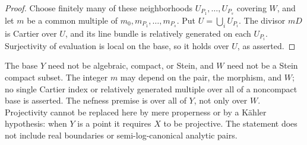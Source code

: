 \begin{proof}
Choose finitely many of these neighborhoods \(U_{P_1},\ldots,U_{P_s}\)
covering \(W\), and let \(m\) be a common multiple of
\(m_0,m_{P_1},\ldots,m_{P_s}\). Put \(U=\bigcup_i U_{P_i}\).
The divisor \(mD\) is Cartier over \(U\), and its line bundle is
relatively generated on each \(U_{P_i}\). Surjectivity of evaluation
is local on the base, so it holds over \(U\), as asserted.
\end{proof}

The base \(Y\) need not be algebraic, compact, or Stein, and \(W\) need
not be a Stein compact subset. The integer \(m\) may depend on the pair,
the morphism, and \(W\); no single Cartier index or relatively generated
multiple over all of a noncompact base is asserted. The nefness premise is
over all of \(Y\), not only over \(W\). Projectivity cannot be replaced here
by mere properness or by a K\"ahler hypothesis: when \(Y\) is a point it
requires \(X\) to be projective. The statement does not include real
boundaries or semi-log-canonical analytic pairs.
